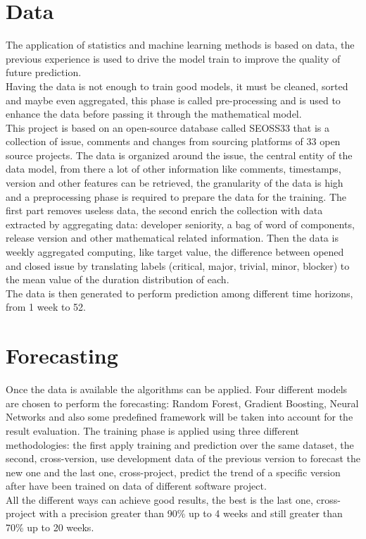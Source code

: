 \documentclass{article}
\begin{document}
\section{Data}
The application of statistics and machine learning methods is based on data, the previous experience is used to drive the model train to improve the quality of future prediction.\\
Having the data is not enough to train good models, it must be cleaned, sorted and maybe even aggregated, this phase is called pre-processing and is used to enhance the data before passing it through the mathematical model.\\
This project is based on an open-source database called SEOSS33 that is a collection of issue, comments and changes from sourcing platforms of 33 open source projects. The data is organized around the issue, the central entity of the data model, from there a lot of other information like comments, timestamps, version and other features can be retrieved, the granularity of the data is high and a preprocessing phase is required to prepare the data for the training. The first part removes useless data, the second enrich the collection with data extracted by aggregating data: developer seniority, a bag of word of components, release version and other mathematical related information. Then the data is weekly aggregated computing, like target value, the difference between opened and closed issue by translating labels (critical, major, trivial, minor, blocker) to the mean value of the duration distribution of each.\\
The data is then generated to perform prediction among different time horizons, from 1 week to 52.

\section{Forecasting}
Once the data is available the algorithms can be applied. Four different models are chosen to perform the forecasting: Random Forest, Gradient Boosting, Neural Networks and also some predefined framework will be taken into account for the result evaluation. The training phase is applied using three different methodologies: the first apply training and prediction over the same dataset, the second, cross-version, use development data of the previous version to forecast the new one and the last one, cross-project, predict the trend of a specific version after have been trained on data of different software project.\\
All the different ways can achieve good results, the best is the last one, cross-project with a precision greater than 90\% up to 4 weeks and still greater than 70\% up to 20 weeks. 
\end{document}
